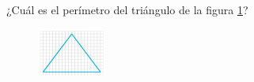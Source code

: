 
¿Cuál es el perímetro del triángulo de la figura \ref{fig:peri_isos_02}?
\begin{figure}[H]
    \begin{center}
        \includegraphics[width=0.2\textwidth]{../images/peri_isos_02.png}
    \end{center}
    \caption{}
    \label{fig:peri_isos_02}
\end{figure}